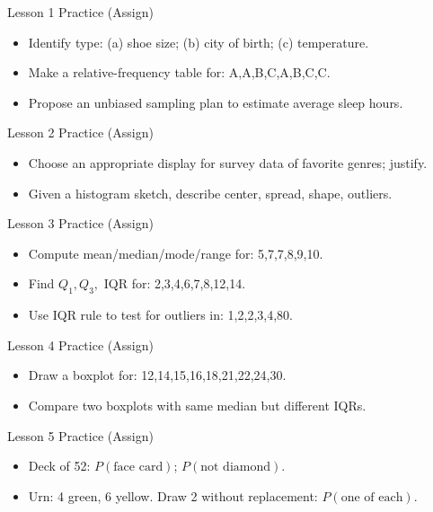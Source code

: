 \documentclass[aspectratio=169]{beamer}
\begin{document}
\begin{frame}{Lesson 1 Practice (Assign)}
\begin{itemize}
  \item Identify type: (a) shoe size; (b) city of birth; (c) temperature.
  \item Make a relative-frequency table for: A,A,B,C,A,B,C,C.
  \item Propose an unbiased sampling plan to estimate average sleep hours.
\end{itemize}
\end{frame}

\begin{frame}{Lesson 2 Practice (Assign)}
\begin{itemize}
  \item Choose an appropriate display for survey data of favorite genres; justify.
  \item Given a histogram sketch, describe center, spread, shape, outliers.
\end{itemize}
\end{frame}

\begin{frame}{Lesson 3 Practice (Assign)}
\begin{itemize}
  \item Compute mean/median/mode/range for: 5,7,7,8,9,10.
  \item Find $Q_1,Q_3,$ IQR for: 2,3,4,6,7,8,12,14.
  \item Use IQR rule to test for outliers in: 1,2,2,3,4,80.
\end{itemize}
\end{frame}

\begin{frame}{Lesson 4 Practice (Assign)}
\begin{itemize}
  \item Draw a boxplot for: 12,14,15,16,18,21,22,24,30.
  \item Compare two boxplots with same median but different IQRs.
\end{itemize}
\end{frame}

\begin{frame}{Lesson 5 Practice (Assign)}
\begin{itemize}
  \item Deck of 52: $P(\text{face card})$; $P(\text{not diamond})$.
  \item Urn: 4 green, 6 yellow. Draw 2 without replacement: $P(\text{one of each})$.
\end{itemize}
\end{frame}
\end{document}
